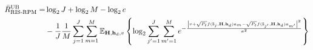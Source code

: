 \documentclass[draftclsnofoot,onecolumn,12pt]{IEEEtran}
\begin{document}
\begin{figure}[!t]
	\begin{align}\label{mi-h case1}
	\bar{R}_\text{RIS-RPM}^\text{UB}=&\log_2 J+\log_2 M -\log_2e \notag\\ &-\frac{1}{{J}}\frac{1}{M}\sum_{j=1}^{J}\sum_{m=1}^{M}\mathbb{E}_{{\bf H},{\bf h}_d,v}\left\{\log_2 \sum_{j'=1}^{J}\sum_{m'=1}^{M} e^{-\frac{\left| v+\sqrt{P_t} f(\mathbb{S}_j,{\bf H},{\bf h}_d) a_m-\sqrt{P_t} f(\mathbb{S}_{j'},{\bf H},{\bf h}_d) a_{m'} \right|^2}{\sigma^2}} \right\}
	\end{align}
	\hrulefill
\end{figure}

\end{document}
